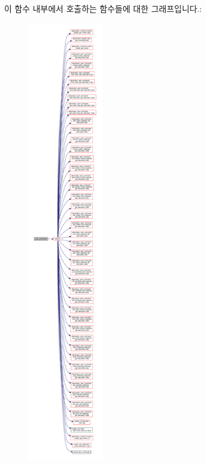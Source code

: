 이 함수 내부에서 호출하는 함수들에 대한 그래프입니다.\+:
\nopagebreak
\begin{figure}[H]
\begin{center}
\leavevmode
\includegraphics[height=550pt]{classavdecc__lib_1_1aecp__controller__state__machine_ab9bb717d50b960910aa54219117fb0be_cgraph}
\end{center}
\end{figure}




